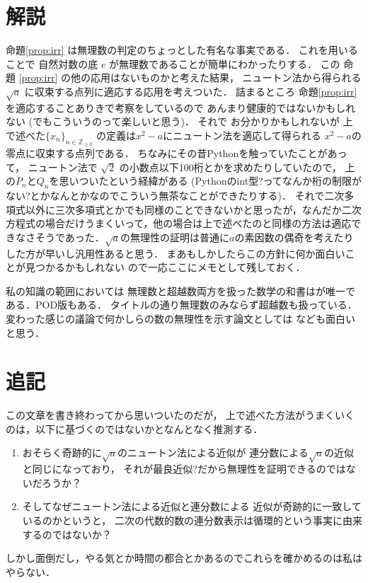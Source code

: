 \documentclass[leqno, a4paper, 12pt]{jsarticle}
\newcommand{\zz}{\mathbb{Z}}
\begin{document}
\section{解説}
命題\ref{prop:irr}
は無理数の判定のちょっとした有名な事実である．
これを用いることで
自然対数の底
$e$
が無理数であることが簡単にわかったりする．
この
命題
\ref{prop:irr}
の他の応用はないものかと考えた結果，
ニュートン法から得られる$\sqrt{a}$
に収束する点列に適応する応用を考えついた．
詰まるところ
命題\ref{prop:irr}
を適応することありきで考察をしているので
あんまり健康的ではないかもしれない
(でもこういうのって楽しいと思う)．
それで
お分かりかもしれないが
上で述べた$\{x_{n}\}_{n\in \zz_{\ge 0}}$
の定義は$x^{2}-a$にニュートン法を適応して得られる
$x^{2}-a$の零点に収束する点列である．
ちなみにその昔Pythonを触っていたことがあって，
ニュートン法で
$\sqrt{2}$
の小数点以下100桁とかを求めたりしていたので，
上の$P_{n}$と$Q_{n}$を思いついたという経緯がある
(Pythonのint型?ってなんか桁の制限がない?とかなんとかなのでこういう無茶なことができたりする)．
それで二次多項式以外に三次多項式とかでも同様のことできないかと思ったが，なんだか二次方程式の場合だけうまくいって，他の場合は上で述べたのと同様の方法は適応できなさそうであった．$\sqrt{a}$の無理性の証明は普通に$a$の素因数の偶奇を考えたりした方が早いし汎用性あると思う．
まあもしかしたらこの方針に何か面白いことが見つかるかもしれない
ので一応ここにメモとして残しておく．

私の知識の範囲においては
無理数と超越数両方を扱った数学の和書は\cite{shio}が唯一である．POD版もある．
タイトルの通り無理数のみならず超越数も扱っている．
変わった感じの議論で何かしらの数の無理性を示す論文としては
\cite{MM}なども面白いと思う．

\section{追記}
この文章を書き終わってから思いついたのだが，
上で述べた方法がうまくいくのは，以下に基づくのではないかとなんとなく推測する．
\begin{enumerate}[label=\textup{(\arabic*)}]
\item 
おそらく奇跡的に$\sqrt{a}$のニュートン法による近似が
連分数による$\sqrt{a}$の近似と同じになっており，
それが最良近似?だから無理性を証明できるのではないだろうか？
\item 
そしてなぜニュートン法による近似と連分数による
近似が奇跡的に一致しているのかというと，
二次の代数的数の連分数表示は循環的という事実に由来するのではないか？
\end{enumerate}
しかし面倒だし，やる気とか時間の都合とかあるのでこれらを確かめるのは私はやらない．
\end{document}
